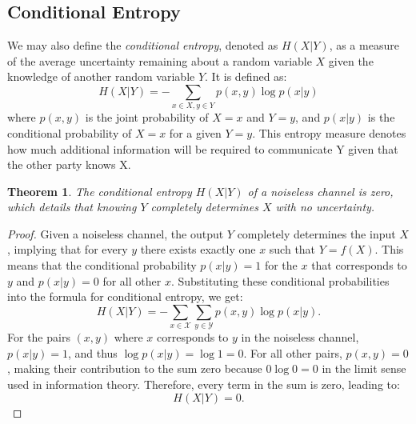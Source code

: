 \documentclass[12pt]{article}
\newtheorem{theorem}{Theorem}
\begin{document}
		\subsection{Conditional Entropy}
		We may also define the \emph{conditional entropy}, denoted as \(H(X|Y)\), as a measure of the average uncertainty remaining about a random variable \(X\) given the knowledge of another random variable \(Y\).  It is defined as:
		\[
		H(X|Y) = -\sum_{x \in X, y \in Y} p(x, y) \log p(x|y)
		\]
		where \(p(x, y)\) is the joint probability of \(X=x\) and \(Y=y\), and \( p(x|y) \) is the conditional probability of \(X = x\) for a given \(Y = y\).  This entropy measure denotes how much additional information will be required 
		to communicate Y given that the other party knows X.
		
		
		\begin{theorem}
			The conditional entropy $H(X|Y)$ of a noiseless channel is zero, which details that knowing $Y$ completely determines $X$ with no uncertainty.
		\end{theorem}
		\begin{proof}
			Given a noiseless channel, the output $Y$ completely determines the input $X$, implying that for every $y$ there exists exactly one $x$ such that $Y = f(X)$. This means that the conditional probability $p(x|y) = 1$ for the $x$ that corresponds to $y$ and $p(x|y) = 0$ for all other $x$. Substituting these conditional probabilities into the formula for conditional entropy, we get:
			\begin{equation}
				H(X|Y) = -\sum_{x \in \mathcal{X}} \sum_{y \in \mathcal{Y}} p(x, y) \log p(x|y).
			\end{equation}
			For the pairs $(x, y)$ where $x$ corresponds to $y$ in the noiseless channel, $p(x|y) = 1$, and thus $\log p(x|y) = \log 1 = 0$. For all other pairs, $p(x, y) = 0$, making their contribution to the sum zero because $0 \log 0 = 0$ in the limit sense used in information theory. Therefore, every term in the sum is zero, leading to:
			\begin{equation}
				H(X|Y) = 0.
			\end{equation}
		\end{proof}
		
\end{document}
